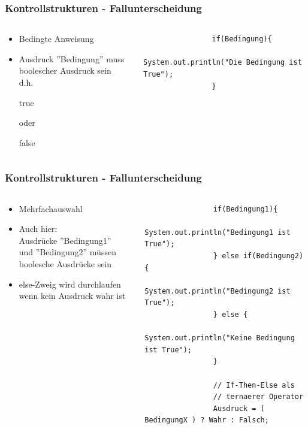 \begin{frame}[fragile]
	\frametitle{Kontrollstrukturen - Fallunterscheidung}
	\begin{columns}
		\begin{column}{0.5\textwidth}
		\small
			\begin{itemize}
			  \item Bedingte Anweisung
			  \item Ausdruck ''Bedingung'' muss boolescher Ausdruck sein\\
			  d.h. \begin{itshape}true\end{itshape} oder
			  \begin{itshape}false\end{itshape}
			\end{itemize}
		\end{column}
		\begin{column}{0.5\textwidth}
			\begin{lstlisting}
				if(Bedingung){
					System.out.println("Die Bedingung ist True");
				}
			\end{lstlisting}
		\end{column}
	\end{columns}
\end{frame}

\begin{frame}[fragile]
	\frametitle{Kontrollstrukturen - Fallunterscheidung}
	\begin{columns}
		\begin{column}{0.5\textwidth}
			\small
			\begin{itemize}
			  \item Mehrfachauswahl
			  \item Auch hier: \\ 
			  Ausdr\"ucke ''Bedingung1'' \\
			  und ''Bedingung2'' m\"ussen boolesche Ausdr\"ucke sein\\
			  \item else-Zweig wird durchlaufen wenn kein Ausdruck wahr ist
			\end{itemize}
		\end{column}
		\begin{column}{0.5\textwidth}
			\begin{lstlisting}
				if(Bedingung1){
					System.out.println("Bedingung1 ist True");
				} else if(Bedingung2){
					System.out.println("Bedingung2 ist True");
				} else {
					System.out.println("Keine Bedingung ist True");
				}
				
				// If-Then-Else als 
				// ternaerer Operator
				Ausdruck = ( BedingungX ) ? Wahr : Falsch;
			\end{lstlisting}
		\end{column}
	\end{columns}
\end{frame}

